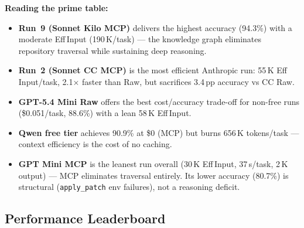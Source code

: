 \noindent
\textbf{Reading the prime table:}
\begin{itemize}[nosep, leftmargin=*]
  \item \textbf{Run~9 (Sonnet Kilo MCP)} delivers the highest accuracy (94.3\%)
        with a moderate Eff\,Input (190\,K/task) --- the knowledge graph eliminates
        repository traversal while sustaining deep reasoning.
  \item \textbf{Run~2 (Sonnet CC MCP)} is the most efficient Anthropic run:
        55\,K Eff\,Input/task, 2.1$\times$ faster than Raw, but sacrifices
        3.4\,pp accuracy vs CC Raw.
  \item \textbf{GPT-5.4 Mini Raw} offers the best cost/accuracy trade-off for
        non-free runs (\$0.051/task, 88.6\%) with a lean 58\,K Eff\,Input.
  \item \textbf{Qwen free tier} achieves 90.9\% at \$0 (MCP) but burns 656\,K
        tokens/task --- context efficiency is the cost of no caching.
  \item \textbf{GPT Mini MCP} is the leanest run overall (30\,K Eff\,Input,
        37\,s/task, 2\,K output) --- MCP eliminates traversal entirely.
        Its lower accuracy (80.7\%) is structural (\texttt{apply\_patch} env failures),
        not a reasoning deficit.
\end{itemize}

\subsection{Performance Leaderboard}

